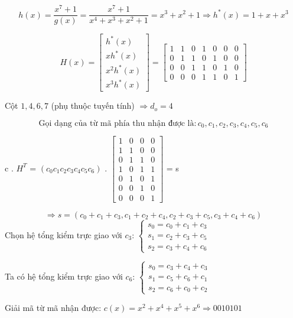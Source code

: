 \documentclass[12pt]{article}
\begin{document}
\[
h(x) = \frac{x^7 + 1}{g(x)} = \frac{x^7 + 1}{x^4 + x^3 + x^2 + 1} = x^3 + x^2 + 1 \Rightarrow h^*(x) = 1 + x + x^3
\]

\[
H(x) = 
\begin{bmatrix}
h^*(x) \\
x h^*(x) \\
x^2 h^*(x) \\
x^3 h^*(x)
\end{bmatrix}
=
\begin{bmatrix}
1 & 1 & 0 & 1 & 0 & 0 & 0 \\
0 & 1 & 1 & 0 & 1 & 0 & 0 \\
0 & 0 & 1 & 1 & 0 & 1 & 0 \\
0 & 0 & 0 & 1 & 1 & 0 & 1
\end{bmatrix}
\]

Cột $1, 4, 6, 7$ (phụ thuộc tuyến tính) $\Rightarrow d_o = 4$


\[
\text{Gọi dạng của từ mã phía thu nhận được là}: c_0, c_1, c_2, c_3, c_4, c_5, c_6
\]

 c . $H^T$ = $(c_0 c_1 c_2 c_3 c_4 c_5 c_6)$ . $\begin{bmatrix}
1 & 0 & 0 & 0 \\
1 & 1 & 0 & 0 \\
0 & 1 & 1 & 0 \\
1 & 0 & 1 & 1 \\
0 & 1 & 0 & 1 \\
0 & 0 & 1 & 0 \\
0 & 0 & 0 & 1
\end{bmatrix}$ = s

\[
\Rightarrow s = (c_0 + c_1 + c_3, c_1 + c_2 + c_4, c_2 + c_3 + c_5, c_3 + c_4 + c_6)
\]
Chọn hệ tổng kiểm trực giao với $c_3$:
$\begin{cases}
s_0 = c_0 + c_1 + c_3 \\
s_1 = c_2 + c_3 + c_5 \\
s_2 = c_3 + c_4 + c_6
\end{cases}$

Ta có hệ tổng kiểm trực giao với $c_6$:
$\begin{cases}
s_0 = c_3 + c_4 + c_3 \\
s_1 = c_5 + c_6 + c_1 \\
s_2 = c_6 + c_0 + c_2
\end{cases}$

Giải mã từ mã nhận được: $c(x) = x^2 + x^4 + x^5 + x^6 \Rightarrow 0010101$
\end{document}

